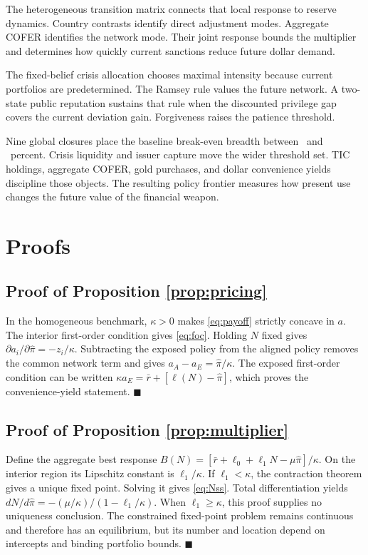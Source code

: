 \documentclass[11pt]{article}
\theoremstyle{definition}
\begin{document}
The heterogeneous transition matrix connects that local response to reserve dynamics. Country contrasts identify direct adjustment modes. Aggregate COFER identifies the network mode. Their joint response bounds the multiplier and determines how quickly current sanctions reduce future dollar demand.

The fixed-belief crisis allocation chooses maximal intensity because current portfolios are predetermined. The Ramsey rule values the future network. A two-state public reputation sustains that rule when the discounted privilege gap covers the current deviation gain. Forgiveness raises the patience threshold.

Nine global closures place the baseline break-even breadth between \PBEClosureLow\ and \PBEClosureHigh\ percent. Crisis liquidity and issuer capture move the wider threshold set. TIC holdings, aggregate COFER, gold purchases, and dollar convenience yields discipline those objects. The resulting policy frontier measures how present use changes the future value of the financial weapon.

\clearpage
\appendix
\renewcommand{\theequation}{\thesection.\arabic{equation}}

\section{Proofs}\label{app:proofs}

\subsection{Proof of Proposition \ref{prop:pricing}}
In the homogeneous benchmark, $\kappa>0$ makes \eqref{eq:payoff} strictly concave in $a$. The interior first-order condition gives \eqref{eq:foc}. Holding $N$ fixed gives $\partial a_i/\partial\hat\pi=-z_i/\kappa$. Subtracting the exposed policy from the aligned policy removes the common network term and gives $a_A-a_E=\hat\pi/\kappa$. The exposed first-order condition can be written $\kappa a_E=\bar r+[\ell(N)-\hat\pi]$, which proves the convenience-yield statement. $\blacksquare$

\subsection{Proof of Proposition \ref{prop:multiplier}}
Define the aggregate best response $B(N)=[\bar r+\ell_0+\ell_1N-\mu\hat\pi]/\kappa$. On the interior region its Lipschitz constant is $\ell_1/\kappa$. If $\ell_1<\kappa$, the contraction theorem gives a unique fixed point. Solving it gives \eqref{eq:Nss}. Total differentiation yields $dN/d\hat\pi=-(\mu/\kappa)/(1-\ell_1/\kappa)$. When $\ell_1\geq\kappa$, this proof supplies no uniqueness conclusion. The constrained fixed-point problem remains continuous and therefore has an equilibrium, but its number and location depend on intercepts and binding portfolio bounds. $\blacksquare$
\end{document}
